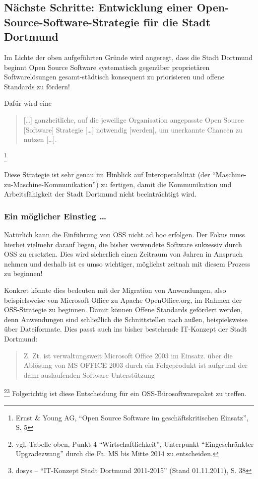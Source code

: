 \documentclass[a4paper]{scrartcl}
\begin{document}
\subsection{Nächste Schritte: Entwicklung einer Open-Source-Software-Strategie für die Stadt Dortmund}

Im Lichte der oben aufgeführten Gründe wird angeregt, dass die Stadt Dortmund
beginnt Open Source Software systematisch gegenüber proprietären
Softwarelösungen gesamt-städtisch konsequent zu priorisieren und offene
Standards zu fördern!

Dafür wird eine
\begin{quote} [\ldots]
  ganzheitliche, auf die jeweilige Organisation angepasste Open Source
  [Software] Strategie [\ldots] notwendig [werden], um unerkannte Chancen zu
  nutzen [\ldots].\end{quote}\footnote{Ernst \& Young AG, ``Open Source Software
  im geschäftskritischen Einsatz'', S. 5}

Diese Strategie ist sehr genau im Hinblick auf Interoperabilität (der
``Maschine-zu-Maschine-Kommunikation'') zu fertigen, damit die Kommunikation und
Arbeitsfähigkeit der Stadt Dortmund nicht beeinträchtigt wird.

\subsubsection{Ein möglicher Einstieg \ldots}

Natürlich kann die Einführung von OSS nicht ad hoc erfolgen. Der Fokus muss
hierbei vielmehr darauf liegen, die bisher verwendete Software sukzessiv durch
OSS zu ersetzten. Dies wird sicherlich einen Zeitraum von Jahren in Anspruch
nehmen und deshalb ist es umso wichtiger, möglichst zeitnah mit diesem Prozess
zu beginnen!

Konkret könnte dies bedeuten mit der Migration von Anwendungen, also
beispielsweise von Microsoft Office zu Apache OpenOffice.org, im Rahmen der
OSS-Strategie zu beginnen. Damit können Offene Standards gefördert werden, denn
Anwendungen sind schließlich die Schnittstellen nach außen, beispielsweise über
Dateiformate. Dies passt auch ins bisher bestehende IT-Konzept der Stadt
Dortmund:
\begin{quote}Z. Zt. ist verwaltungsweit Microsoft Office 2003 im Einsatz. über
  die Ablösung von MS OFFICE 2003 durch ein Folgeprodukt ist aufgrund der dann
  auslaufenden Software-Unterstützung\end{quote}\footnote{vgl.  Tabelle oben,
  Punkt 4 ``Wirtschaftlichkeit'', Unterpunkt ``Eingeschränkter Upgradezwang''
  durch die Fa. MS bis Mitte 2014 zu entscheiden.}\footnote{dosys --
  ``IT-Konzept Stadt Dortmund 2011-2015'' (Stand 01.11.2011), S. 38}
Folgerichtig ist diese Entscheidung für ein OSS-Bürosoftwarepaket zu treffen.
\end{document}
